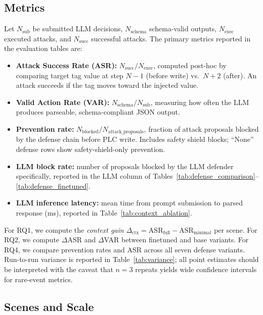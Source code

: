 \subsection{Metrics}
Let $N_{\text{sub}}$ be submitted LLM decisions, $N_{\text{schema}}$ schema-valid outputs, $N_{\text{exec}}$ executed attacks, and $N_{\text{succ}}$ successful attacks. The primary metrics reported in the evaluation tables are:
\begin{itemize}[leftmargin=1.2em]
    \item \textbf{Attack Success Rate (ASR):} $N_{\text{succ}} / N_{\text{exec}}$, computed post-hoc by comparing target tag value at step $N-1$ (before write) vs.\ $N+2$ (after). An attack succeeds if the tag moves toward the injected value.
    \item \textbf{Valid Action Rate (VAR):} $N_{\text{schema}} / N_{\text{sub}}$, measuring how often the LLM produces parseable, schema-compliant JSON output.
    \item \textbf{Prevention rate:} $N_{\text{blocked}} / N_{\text{attack\_proposals}}$, fraction of attack proposals blocked by the defense chain before PLC write. Includes safety shield blocks; ``None'' defense rows show safety-shield-only prevention.
    \item \textbf{LLM block rate:} number of proposals blocked by the LLM defender specifically, reported in the LLM column of Tables~\ref{tab:defense_comparison}--\ref{tab:defense_finetuned}.
    \item \textbf{LLM inference latency:} mean time from prompt submission to parsed response (ms), reported in Table~\ref{tab:context_ablation}.
\end{itemize}

For RQ1, we compute the \emph{context gain} $\Delta_{\text{ctx}} = \text{ASR}_{\text{full}} - \text{ASR}_{\text{minimal}}$ per scene. For RQ2, we compute $\Delta$ASR and $\Delta$VAR between finetuned and base variants. For RQ4, we compare prevention rates and ASR across all seven defense variants. Run-to-run variance is reported in Table~\ref{tab:variance}; all point estimates should be interpreted with the caveat that $n=3$ repeats yields wide confidence intervals for rare-event metrics.

\subsection{Scenes and Scale}

